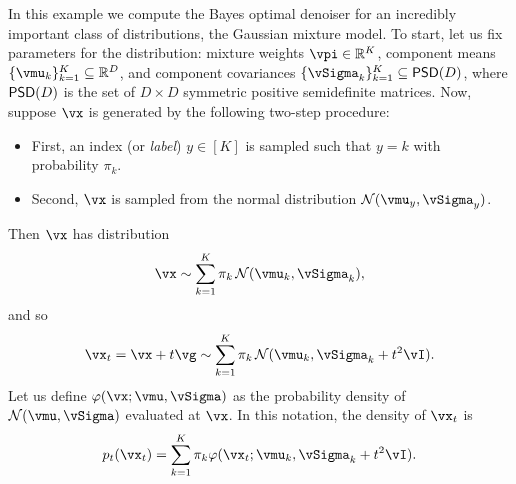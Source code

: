 \documentclass[../../book-main.tex]{subfiles}
\begin{document}
\begin{example}\label{example:denoising_gaussian_mixture}
	In this example we compute the Bayes optimal denoiser for an incredibly important class of distributions, the Gaussian mixture model. To start, let us fix parameters for the distribution: mixture weights \(\vpi \in \R^{K}\), component means \(\{\vmu_{k}\}_{k = 1}^{K} \subseteq \R^{D}\), and component covariances \(\{\vSigma_{k}\}_{k = 1}^{K} \subseteq \PSD(D)\), where  \(\mathsf{PSD}(D)\) is the set of \(D \times D\) symmetric positive semidefinite matrices. Now, suppose \(\vx\) is generated by the following two-step procedure:
	\begin{itemize}
		\item First, an index (or \textit{label}) \(y \in [K]\) is sampled such that \(y = k\) with probability \(\pi_{k}\).
		\item Second, \(\vx\) is sampled from the normal distribution \(\dNorm(\vmu_{y}, \vSigma_{y})\).
	\end{itemize}
	Then \(\vx\) has distribution
	\begin{equation}
		\vx \sim \sum_{k = 1}^{K}\pi_{k}\dNorm(\vmu_{k}, \vSigma_{k}),
	\end{equation}
	and so 
	\begin{equation}
		\vx_{t} = \vx + t\vg \sim \sum_{k = 1}^{K}\pi_{k}\dNorm(\vmu_{k}, \vSigma_{k} + t^{2}\vI).
	\end{equation}
	Let us define \(\phi(\vx ; \vmu, \vSigma)\) as the probability density of \(\dNorm(\vmu, \vSigma)\) evaluated at \(\vx\). In this notation, the density of \(\vx_{t}\) is 
	\begin{equation}
		p_{t}(\vx_{t}) = \sum_{k = 1}^{K}\pi_{k}\phi(\vx_{t} ; \vmu_{k}, \vSigma_{k} + t^{2}\vI).
	\end{equation}


\end{example}
\end{document}
